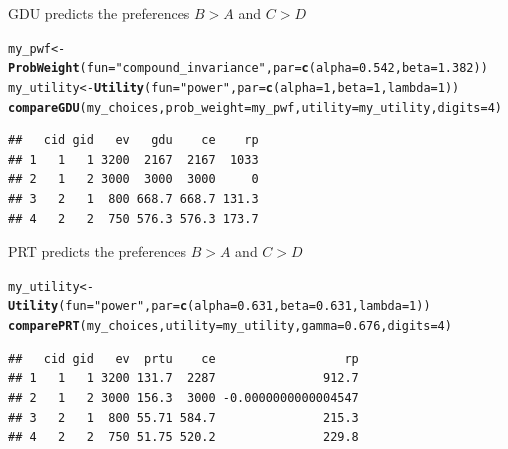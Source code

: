 \documentclass{article}\usepackage[]{graphicx}\usepackage[]{color}
\makeatletter
\newcommand{\hlnum}[1]{\textcolor[rgb]{0.686,0.059,0.569}{#1}}%
\newcommand{\hlstr}[1]{\textcolor[rgb]{0.192,0.494,0.8}{#1}}%
\newcommand{\hlstd}[1]{\textcolor[rgb]{0.345,0.345,0.345}{#1}}%
\newcommand{\hlkwb}[1]{\textcolor[rgb]{0.69,0.353,0.396}{#1}}%
\newcommand{\hlkwc}[1]{\textcolor[rgb]{0.333,0.667,0.333}{#1}}%
\newcommand{\hlkwd}[1]{\textcolor[rgb]{0.737,0.353,0.396}{\textbf{#1}}}%
\newenvironment{kframe}{%
 \def\at@end@of@kframe{}%
 \ifinner\ifhmode%
  \def\at@end@of@kframe{\end{minipage}}%
  \begin{minipage}{\columnwidth}%
 \fi\fi%
 \def\FrameCommand##1{\hskip\@totalleftmargin \hskip-\fboxsep
 \colorbox{shadecolor}{##1}\hskip-\fboxsep
     \hskip-\linewidth \hskip-\@totalleftmargin \hskip\columnwidth}%
 \MakeFramed {\advance\hsize-\width
   \@totalleftmargin\z@ \linewidth\hsize
   \@setminipage}}%
 {\par\unskip\endMakeFramed%
 \at@end@of@kframe}
\newenvironment{knitrout}{}{} %
\makeatother
\begin{document}
GDU predicts the preferences $B > A$ and $C > D$

\begin{knitrout}
\color{fgcolor}\begin{kframe}
\begin{alltt}
\hlstd{my_pwf} \hlkwb{<-} \hlkwd{ProbWeight}\hlstd{(}\hlkwc{fun}\hlstd{=}\hlstr{"compound_invariance"}\hlstd{,} \hlkwc{par}\hlstd{=}\hlkwd{c}\hlstd{(}\hlkwc{alpha}\hlstd{=}\hlnum{0.542}\hlstd{,} \hlkwc{beta}\hlstd{=}\hlnum{1.382}\hlstd{))}
\hlstd{my_utility} \hlkwb{<-} \hlkwd{Utility}\hlstd{(}\hlkwc{fun}\hlstd{=}\hlstr{"power"}\hlstd{,} \hlkwc{par}\hlstd{=}\hlkwd{c}\hlstd{(}\hlkwc{alpha}\hlstd{=}\hlnum{1}\hlstd{,} \hlkwc{beta}\hlstd{=}\hlnum{1}\hlstd{,} \hlkwc{lambda}\hlstd{=}\hlnum{1}\hlstd{))}
\hlkwd{compareGDU}\hlstd{(my_choices,} \hlkwc{prob_weight}\hlstd{=my_pwf,} \hlkwc{utility}\hlstd{=my_utility,} \hlkwc{digits}\hlstd{=}\hlnum{4}\hlstd{)}
\end{alltt}
\begin{verbatim}
##   cid gid   ev   gdu    ce    rp
## 1   1   1 3200  2167  2167  1033
## 2   1   2 3000  3000  3000     0
## 3   2   1  800 668.7 668.7 131.3
## 4   2   2  750 576.3 576.3 173.7
\end{verbatim}
\end{kframe}
\end{knitrout}


PRT predicts the preferences $B > A$ and $C > D$

\begin{knitrout}
\color{fgcolor}\begin{kframe}
\begin{alltt}
\hlstd{my_utility} \hlkwb{<-} \hlkwd{Utility}\hlstd{(}\hlkwc{fun}\hlstd{=}\hlstr{"power"}\hlstd{,} \hlkwc{par}\hlstd{=}\hlkwd{c}\hlstd{(}\hlkwc{alpha}\hlstd{=}\hlnum{0.631}\hlstd{,} \hlkwc{beta}\hlstd{=}\hlnum{0.631}\hlstd{,} \hlkwc{lambda}\hlstd{=}\hlnum{1}\hlstd{))}
\hlkwd{comparePRT}\hlstd{(my_choices,} \hlkwc{utility}\hlstd{=my_utility,} \hlkwc{gamma}\hlstd{=}\hlnum{0.676}\hlstd{,} \hlkwc{digits}\hlstd{=}\hlnum{4}\hlstd{)}
\end{alltt}
\begin{verbatim}
##   cid gid   ev  prtu    ce                  rp
## 1   1   1 3200 131.7  2287               912.7
## 2   1   2 3000 156.3  3000 -0.0000000000004547
## 3   2   1  800 55.71 584.7               215.3
## 4   2   2  750 51.75 520.2               229.8
\end{verbatim}
\end{kframe}
\end{knitrout}
\end{document}
